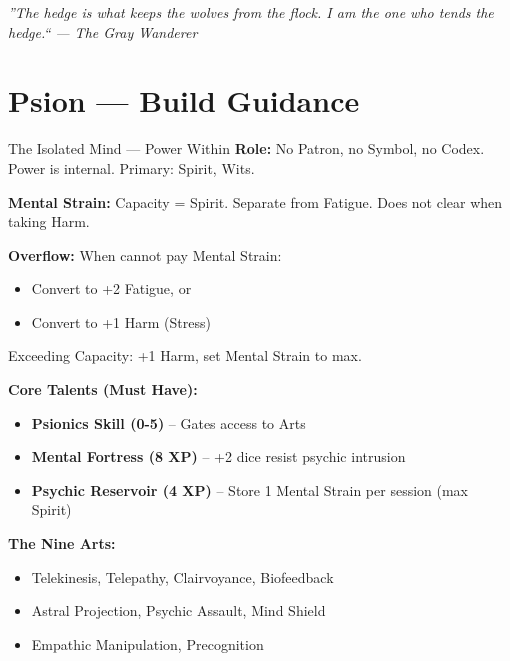 \documentclass[10pt]{article}
\begin{document}
\vspace{0.5em}
\begin{center}
    {\small\sffamily\itshape ''The hedge is what keeps the wolves from the flock. I am the one who tends the hedge.`` --- The Gray Wanderer}
\end{center}

\newpage


\section*{Psion --- Build Guidance}

\begin{tipbox}{The Isolated Mind --- Power Within}
    \textbf{Role:} No Patron, no Symbol, no Codex. Power is internal. Primary: Spirit, Wits.
    
    \textbf{Mental Strain:} Capacity = Spirit. Separate from Fatigue. Does not clear when taking Harm.
    
    \textbf{Overflow:} When cannot pay Mental Strain:
    \begin{itemize}
        \item Convert to +2 Fatigue, or
        \item Convert to +1 Harm (Stress)
    \end{itemize}
    Exceeding Capacity: +1 Harm, set Mental Strain to max.
    
    \textbf{Core Talents (Must Have):}
    \begin{itemize}
        \item \textbf{Psionics Skill (0-5)} -- Gates access to Arts
        \item \textbf{Mental Fortress (8 XP)} -- +2 dice resist psychic intrusion
        \item \textbf{Psychic Reservoir (4 XP)} -- Store 1 Mental Strain per session (max Spirit)
    \end{itemize}
    
    \textbf{The Nine Arts:}
    \begin{itemize}
        \item Telekinesis, Telepathy, Clairvoyance, Biofeedback
        \item Astral Projection, Psychic Assault, Mind Shield
        \item Empathic Manipulation, Precognition
    \end{itemize}
\end{tipbox}
\end{document}
